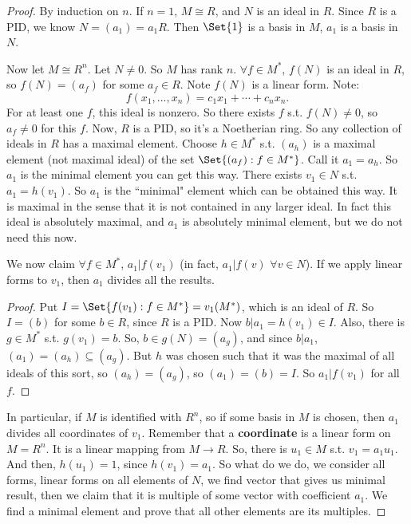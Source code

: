 \documentclass[9pt,reqno,twoside]{amsbook}
\theoremstyle{plain}
\numberwithin{section}{chapter}
\numberwithin{equation}{chapter}
\theoremstyle{definition}
\theoremstyle{remark}
\theoremstyle{plain}
\newcommand{\sub}{\subseteq}
\begin{document}
\begin{proof}
By induction on $n$. If $n = 1$, $M \cong R$, and $N$ is an ideal in $R$. Since $R$ is a PID, we know $N = (a_1) = a_1R$. Then $\Set{1}$ is a basis in $M$, $a_1$ is a basis in $N$. 

Now let $M \cong R^n$. Let $N \neq 0$. So $M$ has rank $n$. $\forall f\in M^*$, $f(N)$ is an ideal in $R$, so $f(N) = (a_f)$ for some $a_f \in R$. Note $f(N)$ is a linear form. Note:
$$
f(x_1,...,x_n) = c_1x_1 + \cdots + c_nx_n.
$$
For at least one $f$, this ideal is nonzero. So there exists $f$ s.t. $f(N) \neq 0$, so $a_f \neq 0$ for this $f$. Now, $R$ is a PID, so it's a Noetherian ring. So any collection of ideals in $R$ has a maximal element. Choose $h \in M^*$ s.t. $(a_h)$ is a maximal element (not maximal ideal) of the set $\Set{(a_f):f \in M^*}$. Call it $a_1 = a_h$. So $a_1$ is the minimal element you can get this way. There exists $v_1 \in N$ s.t. $a_1 = h(v_1)$. So $a_1$ is the ``minimal" element which can be obtained this way. It is maximal in the sense that it is not contained in any larger ideal. In fact this ideal is absolutely maximal, and $a_1$ is absolutely minimal element, but we do not need this now. 

We now claim $\forall f \in M^*$, $a_1|f(v_1)$ (in fact, $a_1|f(v)$ $\forall v \in N$). If we apply linear forms to $v_1$, then $a_1$ divides all the results. 
\begin{proof}
Put $I = \Set{f(v_1):f \in M^*} = v_1(M^*)$, which is an ideal of $R$. So $I = (b)$ for some $b \in R$, since $R$ is a PID. Now $b|a_1 = h(v_1) \in I$. Also, there is $g \in M^*$ s.t. $g(v_1) = b$. So, $b \in g(N) = (a_g)$, and since $b|a_1$, $(a_1) = (a_h) \sub (a_g)$. But $h$ was chosen such that it was the maximal of all ideals of this sort, so $(a_h) = (a_g)$, so $(a_1) = (b) = I$. So $a_1|f(v_1)$ for all $f$. 
\end{proof}

In particular, if $M$ is identified with $R^n$, so if some basis in $M$ is chosen, then $a_1$ divides all coordinates of $v_1$. Remember that a \textbf{coordinate} is a linear form on $M = R^n$. It is a linear mapping from $M \to R$. So, there is $u_1 \in M$ s.t. $v_1 = a_1u_1$. And then, $h(u_1) = 1$, since $h(v_1) = a_1$. So what do we do, we consider all forms, linear forms on all elements of $N$, we find vector that gives us minimal result, then we claim that it is multiple of some vector with coefficient $a_1$. We find a minimal element and prove that all other elements are its multiples. 


\end{proof}
\end{document}
